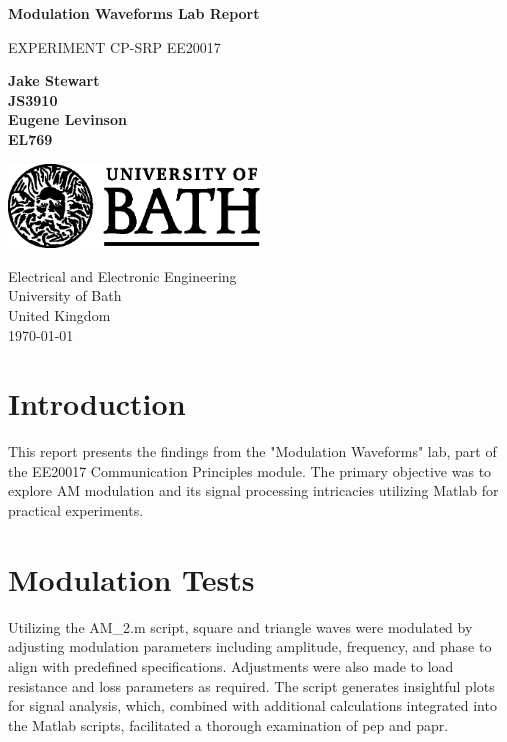 \documentclass[a4paper, twocolumn]{article}
\begin{document}
\begin{titlepage}
    \begin{center}
        \vspace*{1cm}

        \Huge
        \textbf{Modulation Waveforms Lab Report}

        \vspace{0.5cm}
        \LARGE
        EXPERIMENT CP-SRP
        EE20017
        
        \vspace{1.5cm}

        \textbf{Jake Stewart}\\
        \textbf{JS3910}\\

        \textbf{Eugene Levinson}\\
        \textbf{EL769}\\
        \vspace{0.8cm}

                \vfill
                \includegraphics[width=0.5\textwidth]{university_logo.png}

                \Large
                Electrical and Electronic Engineering\\
                University of Bath\\
                United Kingdom\\
                \today
                

            \end{center}
        \end{titlepage}

        \newpage
        \tableofcontents

        \section{Introduction}
        This report presents the findings from the "Modulation Waveforms" lab, part of the EE20017 Communication Principles module. The primary objective was to explore AM modulation and its signal processing intricacies utilizing Matlab for practical experiments.
        
        \section{Modulation Tests}
        Utilizing the AM\_2.m script, square and triangle waves were modulated by adjusting modulation parameters including amplitude, frequency, and phase to align with predefined specifications. Adjustments were also made to load resistance and loss parameters as required. The script generates insightful plots for signal analysis, which, combined with additional calculations integrated into the Matlab scripts, facilitated a thorough examination of \gls{pep} and \gls{papr}.
        
\end{document}
